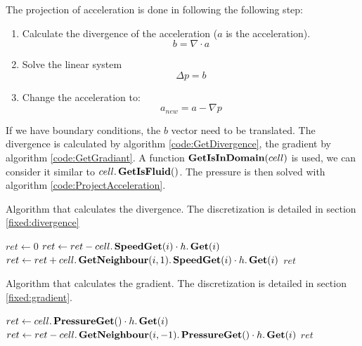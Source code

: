 The projection of acceleration is done in following the following step:
\begin{enumerate}
 \item Calculate the divergence of the acceleration ($a$ is the acceleration).
 \begin{equation}
  b=\nabla \cdot a
 \end{equation}
 \item Solve the linear system
 \begin{equation}
  \Delta p=b
 \end{equation}
 \item Change the acceleration to:
 \begin{equation}
  a_{new}=a-\nabla p
 \end{equation}
\end{enumerate}
If we have boundary conditions, the $b$ vector need to be translated.
The divergence is calculated by algorithm \ref{code:GetDivergence}, the gradient by algorithm \ref{code:GetGradiant}.
A function $\mathop{\textbf{GetIsInDomain}}(cell)$ is used, we can consider it similar to $cell.\mathop{\textbf{GetIsFluid}}()$.
The pressure is then solved with algorithm \ref{code:ProjectAcceleration}.

\begin{algorithm}
\caption{Algorithm that calculates the divergence. The discretization is detailed in section \ref{fixed:divergence}}
\label{code:GetDivergence}
\begin{algorithmic}[1]
		\State $ret\gets 0$
			\State $ret\gets ret-cell.\mathop{\textbf{SpeedGet}}(i)\cdot h.\mathop{\textbf{Get}}(i)$
			\State $ret\gets ret+cell.\mathop{\textbf{GetNeighbour}}(i,1).\mathop{\textbf{SpeedGet}}(i) \cdot h.\mathop{\textbf{Get}}(i)$
		\EndFor
		\State \Return $ret$
	\EndFunction
	 \end{algorithmic}
\end{algorithm}

\begin{algorithm}
\caption{Algorithm that calculates the gradient. The discretization is detailed in section \ref{fixed:gradient}.}
\label{code:GetGradiant}
\begin{algorithmic}[1]
		\State $ret\gets cell.\mathop{\textbf{PressureGet}}()\cdot h.\mathop{\textbf{Get}}(i)$
		\State $ret\gets ret-cell.\mathop{\textbf{GetNeighbour}}(i,-1).\mathop{\textbf{PressureGet}}()\cdot h.\mathop{\textbf{Get}}(i)$
		\State \Return $ret$
\EndFunction
		 \end{algorithmic}
\end{algorithm}

